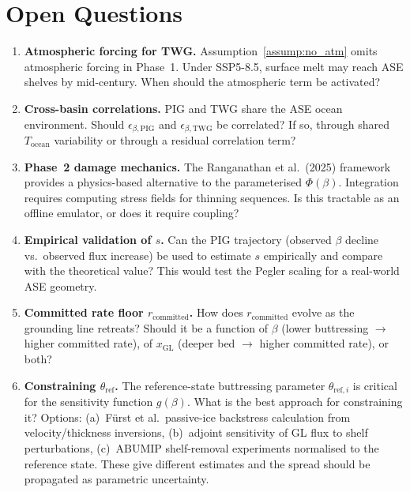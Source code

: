 \documentclass[11pt]{article}
\theoremstyle{definition}
\begin{document}
\section{Open Questions}
\label{sec:open}

\begin{enumerate}
  \item \textbf{Atmospheric forcing for TWG.}  Assumption~\ref{assump:no_atm} omits atmospheric forcing in Phase~1.  Under SSP5-8.5, surface melt may reach ASE shelves by mid-century.  When should the atmospheric term be activated?

  \item \textbf{Cross-basin correlations.}  PIG and TWG share the ASE ocean environment.  Should $\epsilon_{\beta,\text{PIG}}$ and $\epsilon_{\beta,\text{TWG}}$ be correlated?  If so, through shared $T_{\text{ocean}}$ variability or through a residual correlation term?

  \item \textbf{Phase~2 damage mechanics.}  The Ranganathan et al.\ (2025) framework provides a physics-based alternative to the parameterised $\Phi(\beta)$.  Integration requires computing stress fields for thinning sequences.  Is this tractable as an offline emulator, or does it require coupling?

  \item \textbf{Empirical validation of $s$.}  Can the PIG trajectory (observed $\beta$ decline vs.\ observed flux increase) be used to estimate $s$ empirically and compare with the theoretical value?  This would test the Pegler scaling for a real-world ASE geometry.

  \item \textbf{Committed rate floor $r_{\text{committed}}$.}  How does $r_{\text{committed}}$ evolve as the grounding line retreats?  Should it be a function of $\beta$ (lower buttressing $\to$ higher committed rate), of $x_\text{GL}$ (deeper bed $\to$ higher committed rate), or both?

  \item \textbf{Constraining $\theta_{\text{ref}}$.}  The reference-state buttressing parameter $\theta_{\text{ref},i}$ is critical for the sensitivity function $g(\beta)$.  What is the best approach for constraining it?  Options: (a)~F\"{u}rst et al.\ passive-ice backstress calculation from velocity/thickness inversions, (b)~adjoint sensitivity of GL flux to shelf perturbations, (c)~ABUMIP shelf-removal experiments normalised to the reference state.  These give different estimates and the spread should be propagated as parametric uncertainty.


\end{enumerate}
\end{document}
